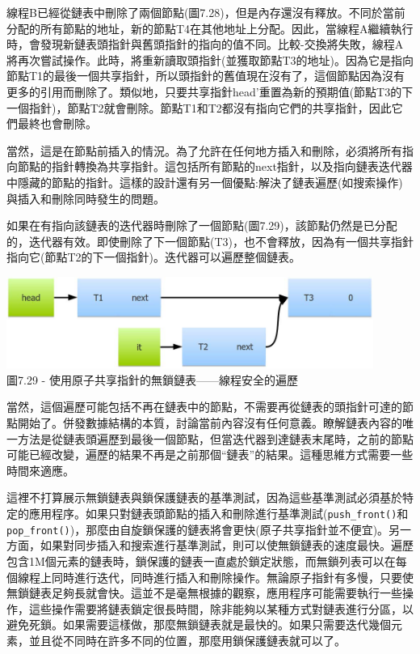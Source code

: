 線程B已經從鏈表中刪除了兩個節點(圖7.28)，但是內存還沒有釋放。不同於當前分配的所有節點的地址，新的節點T4在其他地址上分配。因此，當線程A繼續執行時，會發現新鏈表頭指針與舊頭指針的指向的值不同。比較-交換將失敗，線程A將再次嘗試操作。此時，將重新讀取頭指針(並獲取節點T3的地址)。因為它是指向節點T1的最後一個共享指針，所以頭指針的舊值現在沒有了，這個節點因為沒有更多的引用而刪除了。類似地，只要共享指針head'重置為新的預期值(節點T3的下一個指針)，節點T2就會刪除。節點T1和T2都沒有指向它們的共享指針，因此它們最終也會刪除。

當然，這是在節點前插入的情況。為了允許在任何地方插入和刪除，必須將所有指向節點的指針轉換為共享指針。這包括所有節點的next指針，以及指向鏈表迭代器中隱藏的節點的指針。這樣的設計還有另一個優點:解決了鏈表遍歷(如搜索操作)與插入和刪除同時發生的問題。

如果在有指向該鏈表的迭代器時刪除了一個節點(圖7.29)，該節點仍然是已分配的，迭代器有效。即使刪除了下一個節點(T3)，也不會釋放，因為有一個共享指針指向它(節點T2的下一個指針)。迭代器可以遍歷整個鏈表。

\begin{center}
\includegraphics[width=0.9\textwidth]{content/2/chapter7/images/29.jpg}\\
圖7.29 - 使用原子共享指針的無鎖鏈表——線程安全的遍歷
\end{center}

當然，這個遍歷可能包括不再在鏈表中的節點，不需要再從鏈表的頭指針可達的節點開始了。併發數據結構的本質，討論當前內容沒有任何意義。瞭解鏈表內容的唯一方法是從鏈表頭遍歷到最後一個節點，但當迭代器到達鏈表末尾時，之前的節點可能已經改變，遍歷的結果不再是之前那個“鏈表”的結果。這種思維方式需要一些時間來適應。

這裡不打算展示無鎖鏈表與鎖保護鏈表的基準測試，因為這些基準測試必須基於特定的應用程序。如果只對鏈表頭節點的插入和刪除進行基準測試(\texttt{push\_front()}和\texttt{pop\_front()})，那麼由自旋鎖保護的鏈表將會更快(原子共享指針並不便宜)。另一方面，如果對同步插入和搜索進行基準測試，則可以使無鎖鏈表的速度最快。遍歷包含1M個元素的鏈表時，鎖保護的鏈表一直處於鎖定狀態，而無鎖列表可以在每個線程上同時進行迭代，同時進行插入和刪除操作。無論原子指針有多慢，只要使無鎖鏈表足夠長就會快。這並不是毫無根據的觀察，應用程序可能需要執行一些操作，這些操作需要將鏈表鎖定很長時間，除非能夠以某種方式對鏈表進行分區，以避免死鎖。如果需要這樣做，那麼無鎖鏈表就是最快的。如果只需要迭代幾個元素，並且從不同時在許多不同的位置，那麼用鎖保護鏈表就可以了。

